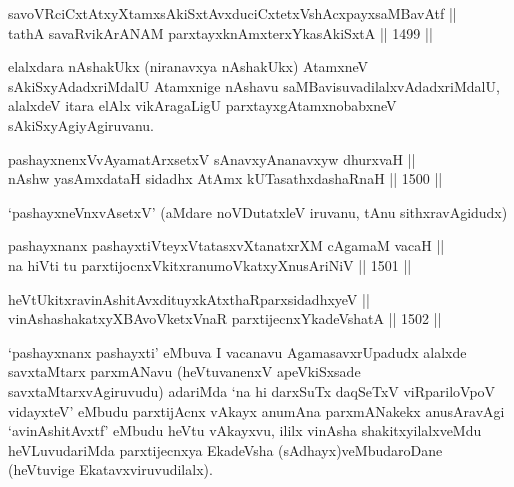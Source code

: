 
\begin{shl}
savoVRciCxtAtxyXtamxsAkiSxtAvxduciCxtetxVshAcxpayxsaMBavAtf ||  \\
tathA savaRvikArANAM parxtayxknAmxterxYkasAkiSxtA \hfill || 1499 ||  
\end{shl}

\begin{artha}
elalxdara nAshakUkx (niranavxya nAshakUkx) AtamxneV sAkiSxyAdadxriMdalU Atamxnige nAshavu saMBavisuvadilalxvAdadxriMdalU, alalxdeV itara elAlx vikAragaLigU parxtayxgAtamxnobabxneV sAkiSxyAgiyAgiruvanu.
\end{artha}

\begin{shl}
pashayxnenxVvAyamatArx\s \s setxV sAnavxyAnanavxyw dhurxvaH || \\
nAshw yasAmxdataH sidadhx AtAmx kUTasathxdashaRnaH \hfill || 1500 ||  
\end{shl}

\begin{artha}
`pashayxneVnxvAsetxV' (aMdare noVDutatxleV iruvanu, tAnu sithxravAgidudx) 
\end{artha}


\begin{shl}
pashayxnanx pashayxtiVteyxVtatasxvXtanatxrXM cA\s \s gamaM vacaH || \\
na hiVti tu parxtijocnxVkitxranumoVkatxyXnusAriNiV \hfill || 1501 ||  
\end{shl}
				
\begin{shl}
heVtUkitxravinAshitAvxdituyxkAtxthaRparxsidadhxyeV || \\
vinAshashakatxyXBAvoVketxVnaR parxtijecnxYkadeVshatA \hfill || 1502 ||  
\end{shl}

\begin{artha}
`pashayxnanx pashayxti' eMbuva I vacanavu AgamasavxrUpadudx alalxde savxtaMtarx parxmANavu (heVtuvanenxV apeVkiSxsade savxtaMtarxvAgiruvudu) adariMda `na hi darxSuTx daqSeTxV viRpariloVpoV vidayxteV' eMbudu parxtijAcnx vAkayx anumAna parxmANakekx anusAravAgi `avinAshitAvxtf' eMbudu heVtu vAkayxvu, ililx vinAsha shakitxyilalxveMdu heVLuvudariMda parxtijecnxya EkadeVsha (sAdhayx)veMbudaroDane (heVtuvige Ekatavxviruvudilalx).
\end{artha}

